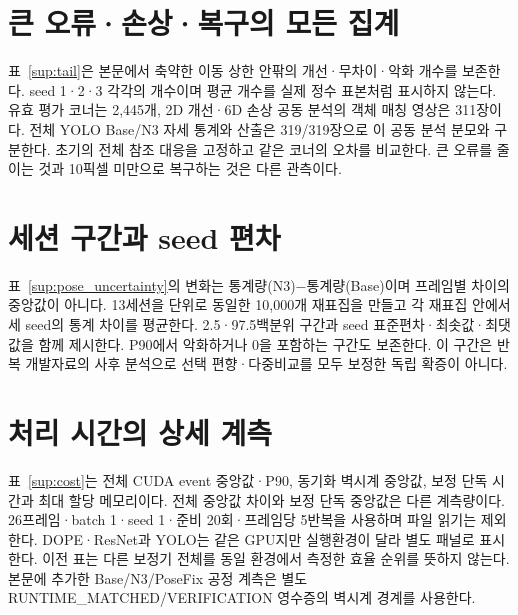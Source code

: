 \documentclass[journal,twoside,web]{ieeecolor}
\begin{document}
\section{큰 오류·손상·복구의 모든 집계}
표~\ref{sup:tail}은 본문에서 축약한 이동 상한 안팎의 개선·무차이·악화 개수를 보존한다. seed 1·2·3 각각의 개수이며 평균 개수를 실제 정수 표본처럼 표시하지 않는다. 유효 평가 코너는 2,445개, 2D 개선·6D 손상 공동 분석의 객체 매칭 영상은 311장이다. 전체 YOLO Base/N3 자세 통계와 산출은 319/319장으로 이 공동 분석 분모와 구분한다. 초기의 전체 참조 대응을 고정하고 같은 코너의 오차를 비교한다. 큰 오류를 줄이는 것과 10픽셀 미만으로 복구하는 것은 다른 관측이다.


\section{세션 구간과 seed 편차}
표~\ref{sup:pose_uncertainty}의 변화는 통계량(N3)−통계량(Base)이며 프레임별 차이의 중앙값이 아니다. 13세션을 단위로 동일한 10,000개 재표집을 만들고 각 재표집 안에서 세 seed의 통계 차이를 평균한다. 2.5·97.5백분위 구간과 seed 표준편차·최솟값·최댓값을 함께 제시한다. P90에서 악화하거나 0을 포함하는 구간도 보존한다. 이 구간은 반복 개발자료의 사후 분석으로 선택 편향·다중비교를 모두 보정한 독립 확증이 아니다.


\section{처리 시간의 상세 계측}
표~\ref{sup:cost}는 전체 CUDA event 중앙값·P90, 동기화 벽시계 중앙값, 보정 단독 시간과 최대 할당 메모리이다. 전체 중앙값 차이와 보정 단독 중앙값은 다른 계측량이다. 26프레임·batch 1·seed 1·준비 20회·프레임당 5반복을 사용하며 파일 읽기는 제외한다. DOPE·ResNet과 YOLO는 같은 GPU지만 실행환경이 달라 별도 패널로 표시한다. 이전 표는 다른 보정기 전체를 동일 환경에서 측정한 효율 순위를 뜻하지 않는다. 본문에 추가한 Base/N3/PoseFix 공정 계측은 별도 RUNTIME\_MATCHED/VERIFICATION 영수증의 벽시계 경계를 사용한다.

\end{document}
